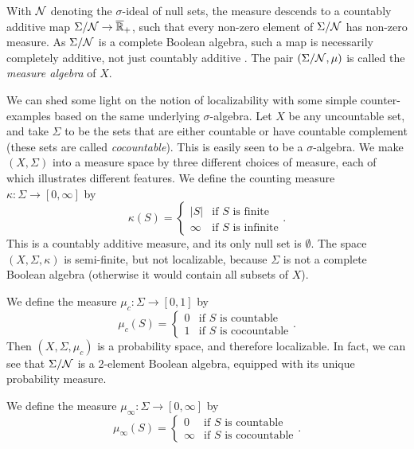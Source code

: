 \documentclass[reqno,T1]{amsproc}
\newcommand{\Rplusext}{\overline{\mathbb{R}}_+} %
\theoremstyle{plain}
\theoremstyle{remark}
\numberwithin{equation}{section}
\begin{document}
With $\mathcal{N}$ denoting the $\sigma$-ideal of null sets, the measure descends to a countably additive map $\Sigma / \Null \to \Rplusext$, such that every non-zero element of $\Sigma / \mathcal{N}$ has non-zero measure. As $\Sigma / \mathcal{N}$ is a complete Boolean algebra, such a map is necessarily completely additive, not just countably additive \cite[321E]{fremlin2}. The pair $(\Sigma/\mathcal{N}, \mu)$ is called the \emph{measure algebra} of $X$. 

We can shed some light on the notion of localizability with some simple counter-examples based on the same underlying $\sigma$-algebra. Let $X$ be any uncountable set, and take $\Sigma$ to be the sets that are either countable or have countable complement (these sets are called \emph{cocountable}). This is easily seen to be a $\sigma$-algebra. We make $(X,\Sigma)$ into a measure space by three different choices of measure, each of which illustrates different features. We define the counting measure $\kappa : \Sigma \rightarrow [0,\infty]$ by
\begin{equation}
\label{CountingMeasDefnEqn}
\kappa(S) = \begin{cases} |S| & \text{if } S \text{ is finite} \\
                          \infty & \text{if } S \text{ is infinite} \end{cases}.
\end{equation}
This is a countably additive measure, and its only null set is $\emptyset$. The space $(X,\Sigma,\kappa)$ is semi-finite, but not localizable, because $\Sigma$ is not a complete Boolean algebra (otherwise it would contain all subsets of $X$). 

We define the measure $\mu_c : \Sigma \rightarrow [0,1]$ by
\begin{equation}
\label{CountableCocountableMeasDefnEqn}
\mu_c(S) = \begin{cases} 0 & \text{if } S \text{ is countable} \\
                         1 & \text{if } S \text{ is cocountable} \end{cases}.
\end{equation}
Then $(X,\Sigma,\mu_c)$ is a probability space, and therefore localizable. In fact, we can see that $\Sigma/ \mathcal{N}$ is a 2-element Boolean algebra, equipped with its unique probability measure. 

We define the measure $\mu_\infty : \Sigma \rightarrow [0,\infty]$ by
\[
\mu_\infty(S) = \begin{cases} 0 & \text{if } S \text{ is countable} \\
                             \infty & \text{if } S \text{ is cocountable} \end{cases}.
\]
\end{document}
